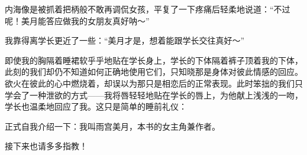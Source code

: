 内海像是被抓着把柄般不敢再调侃女孩，平复了一下疼痛后轻柔地说道：“不过呢！美月能答应做我的女朋友真好呐～”

我靠得离学长更近了一些：“美月才是，想着能跟学长交往真好～”

即使我的胸隔着睡裙软乎乎地贴在学长身上，学长的下体隔着裤子顶着我的下体，此刻的我们却仍不知道如何正确地使用它们，只知晓那是身体对彼此情感的回应。欲火在彼此的心中燃烧着，却误以为那只是相恋后的正常表现。此时笨拙的我们只学会了一种泄欲的方式——我将唇轻轻地贴在学长的唇上，为他献上浅浅的一吻，学长也温柔地回应了我。这只是简单的睡前礼仪：



\newday{\zzz\love\fullmoon\night}

\cutlinec

\newpage


\newday{\newmoon}


{
	正式自我介绍一下：我叫雨宫美月，本书的女主角兼作者。
	
	接下来也请多多指教！
}


\newpage

%
